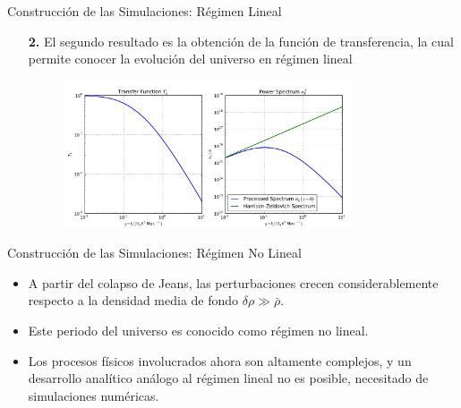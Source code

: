 \documentclass[8pt,fleqn]{beamer}
\begin{document}
\begin{frame}
\begin{block}{Construcción de las Simulaciones: Régimen Lineal}\justifying

\begin{itemize}
\item[\textbf{2.}] El segundo resultado es la obtención de la función de 
transferencia, la cual permite conocer la evolución del universo en régimen
lineal

\begin{figure}[htbp]
	\centering
	\includegraphics[trim = 0mm 0mm 0mm 0mm, clip, width=0.8\textwidth]
	{./figures/Transfer_Function.pdf}
\end{figure}

\end{itemize}

\end{block}
\end{frame}
\begin{frame}
\begin{block}{Construcción de las Simulaciones: Régimen No Lineal}\justifying

\begin{itemize}
\item A partir del colapso de Jeans, las perturbaciones crecen 
considerablemente respecto a la densidad media de fondo $\delta \rho \gg 
\bar \rho$.
\item Este periodo del universo es conocido como régimen no lineal.
\item Los procesos físicos involucrados ahora son altamente complejos, y un
desarrollo analítico análogo al régimen lineal no es posible, necesitado 
de simulaciones numéricas.
\end{itemize}

\end{block}
\end{frame}
\end{document}
